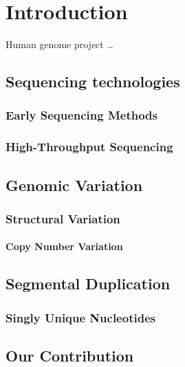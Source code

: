\chapter{Introduction} 
Human genome project \ldots
\newpage
\section{Sequencing technologies}
\subsection{Early Sequencing Methods}
\subsection{High-Throughput Sequencing}
\section{Genomic Variation}
\subsection{Structural Variation}
\subsubsection{Copy Number Variation}
\section{Segmental Duplication}
\subsection{Singly Unique Nucleotides}
\section{Our Contribution}
\newpage
